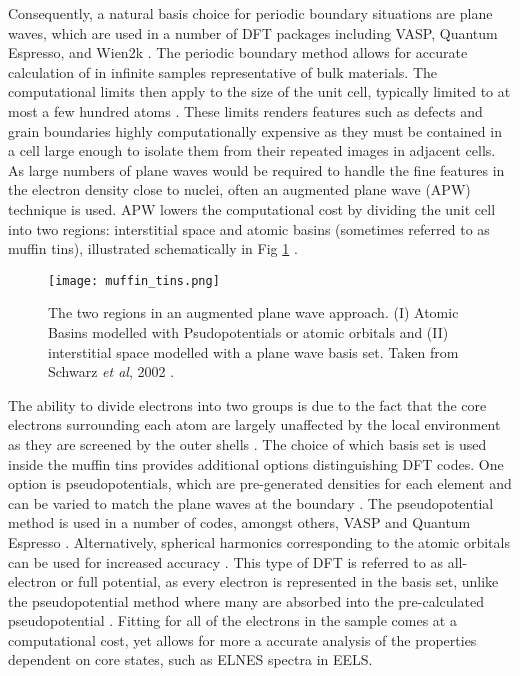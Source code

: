 Consequently, a natural basis choice for periodic boundary situations are plane waves, which are used in a number of DFT packages including VASP, Quantum Espresso, and Wien2k \cite{qe,vasp,wien2k}.  The periodic boundary method allows for accurate calculation of in infinite samples representative of bulk materials.  The computational limits then apply to the size of the unit cell, typically limited to at most a few hundred atoms \cite{mohr_linear_2018}.  These limits renders features such as defects and grain boundaries highly computationally expensive as they must be contained in a cell large enough to isolate them from their repeated images in adjacent cells. 
As large numbers of plane waves would be required to handle the fine features in the electron density close to nuclei, often an augmented plane wave (APW) technique is used.  APW lowers the computational cost by dividing the unit cell into two regions: interstitial space and atomic basins (sometimes referred to as muffin tins), illustrated schematically  in Fig \ref{MT} \cite{wien2k}. \\
\begin{figure}
	\centering
	\texttt{[image: muffin\_tins.png]}
	\caption{The two regions in an augmented plane wave approach.  (I) Atomic Basins modelled with Psudopotentials or atomic orbitals and (II) interstitial space modelled with a plane wave basis set.  Taken from Schwarz \textit{et al}, 2002 \cite{wien2k}. }
	\label{MT}   
\end{figure}

The ability to divide electrons into two groups is due to the fact that the core electrons surrounding each atom are largely unaffected by the local environment as they are screened by the outer shells \cite{wien2k}. The choice of which basis set is used inside the muffin tins provides additional options distinguishing DFT codes.  One option is pseudopotentials, which are pre-generated densities for each element and can be varied to match the plane waves at the boundary \cite{singh_planewaves_2006}.  The pseudopotential method is used in a number of codes, amongst others, VASP and Quantum Espresso \cite{vasp,qe}.  Alternatively, spherical harmonics corresponding to the atomic orbitals can be used for increased accuracy \cite{griffiths}. This type of DFT is referred to as all-electron or full potential, as every electron is represented in the basis set, unlike the pseudopotential method where many are absorbed into the pre-calculated pseudopotential \cite{wien2k}. Fitting for all of the electrons in the sample comes at a computational cost, yet allows for more a accurate analysis of the properties dependent on core states, such as ELNES spectra in EELS.   \\
 
